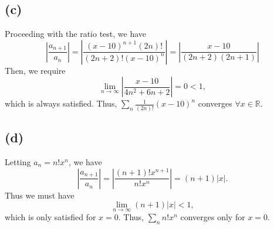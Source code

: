 \documentclass{article}
\newcommand{\R}{\mathbb{R}} %
\begin{document}
\subsection*{(c)}
Proceeding with the ratio test, we have
\begin{equation}
	\left|\frac{a_{n+1}}{a_n}\right| = \left|\frac{(x-10)^{n+1} (2n)!}{(2n+2)!(x-10)^n}\right| = \left|\frac{x-10}{(2n+2)(2n+1)}\right|
\end{equation}
Then, we require
\begin{equation}
	\lim_{n \to \infty} \left|\frac{x-10}{4n^2 + 6n + 2}\right| = 0 < 1,
\end{equation}
which is always satisfied. Thus, $\sum_n \frac{1}{(2n)!}(x-10)^n$ converges $\forall x \in \R$.

\subsection*{(d)}
Letting $a_n = n! x^n$, we have 
\begin{equation}
	\left|\frac{a_{n+1}}{a_n}\right| = \left|\frac{(n+1)!x^{n+1}}{n! x^n}\right| = (n+1)|x|.
\end{equation}
Thus we must have
\begin{equation}
	\lim_{n \to \infty} (n+1)|x| < 1,
\end{equation}
which is only satisfied for $x=0$. Thus, $\sum_n n! x^n$ converges only for $x=0$.
\end{document}
